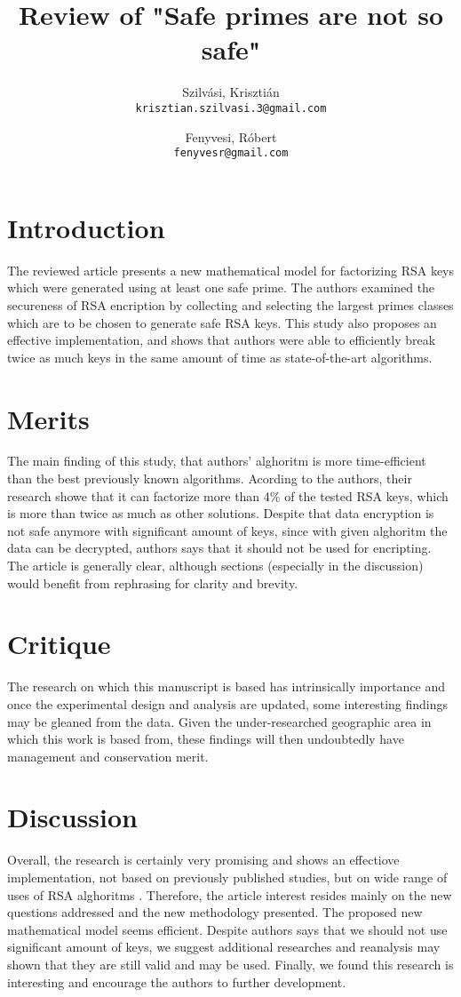 \documentclass[11 pt,a4paper,english]{article}
\title{Review of "Safe primes are not so safe"}
\author{
	Szilvási, Krisztián\\
	\texttt{krisztian.szilvasi.3@gmail.com}
	\and
	Fenyvesi, Róbert\\
	\texttt{fenyvesr@gmail.com}
}
\begin{document}
\maketitle

\newpage

\section{Introduction}
The reviewed article \cite{safeprimes} presents a new mathematical model for factorizing RSA keys which were generated using at least one safe prime. 
The authors examined the secureness of RSA encription by collecting and selecting the largest primes classes which are to be chosen to generate safe RSA keys. 
This study also proposes an effective implementation, and shows that authors were able to efficiently break twice as much keys in the same amount of time as state-of-the-art algorithms. 


\section{Merits}
The main finding of this study, that authors' alghoritm is more time-efficient than the best previously known algorithms. Acording to the authors, their research showe that it can factorize more than 4\% of the tested RSA keys, which is more than twice as much as other solutions. 
Despite that data encryption is not safe anymore with significant amount of keys, since with given alghoritm the data can be decrypted, authors says that it should not be used for encripting. 
The article is generally clear, although sections (especially in the discussion) would benefit from rephrasing for clarity and brevity.


\section{Critique}
The research on which this manuscript is based has intrinsically importance and once the
experimental design and analysis are updated, some interesting findings may be gleaned from the
data. Given the under-researched geographic area in which this work is based from, these findings
will then undoubtedly have management and conservation merit. 


\section{Discussion}
Overall, the research is certainly very promising and shows an effectiove implementation, not based on previously published studies, but on wide range of uses of RSA alghoritms \cite{10.1145/359340.359342}.
Therefore, the article interest resides mainly on the new questions addressed and the new methodology presented. The proposed new mathematical model seems efficient. Despite authors says that we should not use significant amount of keys, we suggest additional researches and reanalysis may shown that they are still valid and may be used.
Finally, we found this research is interesting and encourage the authors to further development.




\newpage
{}

\end{document}
